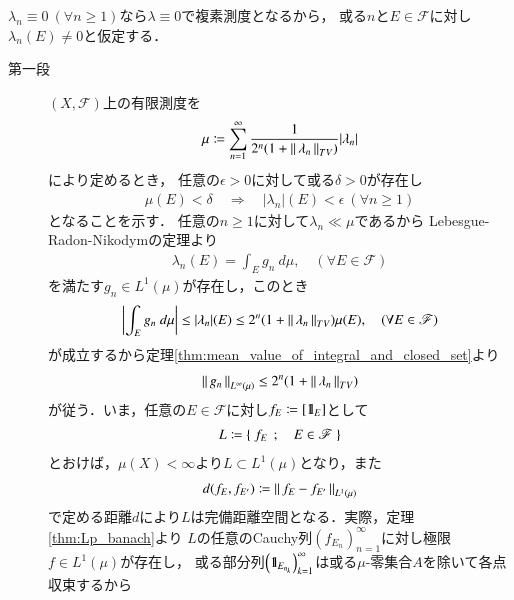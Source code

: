 	\begin{prf}$\lambda_n \equiv 0\ (\forall n \geq 1)$なら$\lambda \equiv 0$で複素測度となるから，
		或る$n$と$E \in \mathscr{F}$に対し$\lambda_n(E) \neq 0$と仮定する．
		\begin{description}
			\item[第一段] $(X,\mathscr{F})$上の有限測度を
				\begin{align}
					\mu \coloneqq \sum_{n=1}^\infty \frac{1}{2^n(1 + \left\|\, \lambda_n\, \right\|_{TV})} |\lambda_n|
				\end{align}
				により定めるとき，%
				任意の$\epsilon > 0$に対して或る$\delta > 0$が存在し
				\begin{align}
					\mu(E) < \delta \quad \Rightarrow \quad |\lambda_n|(E) < \epsilon\ (\forall n \geq 1)
					\label{eq:thm_Vitali_Hahn_Saks_2}
				\end{align}
				となることを示す．
				任意の$n \geq 1$に対して$\lambda_n \ll \mu$であるから
				Lebesgue-Radon-Nikodymの定理より
				\begin{align}
					\lambda_n(E) = \int_E g_n\ d\mu,
					\quad (\forall E \in \mathscr{F})
				\end{align}
				を満たす$g_n \in L^1(\mu)$が存在し，このとき
				\begin{align}
					\left| \int_E g_n\ d\mu \right|
					\leq |\lambda_n|(E)
					\leq 2^n(1+\left\|\, \lambda_n\, \right\|_{TV})\mu(E),
					\quad (\forall E \in \mathscr{F})
				\end{align}
				が成立するから定理\ref{thm:mean_value_of_integral_and_closed_set}より
				\begin{align}
					\left\|\, g_n\, \right\|_{L^\infty(\mu)} \leq 2^n(1+\left\|\, \lambda_n\, \right\|_{TV})
				\end{align}
				が従う．いま，任意の$E \in \mathscr{F}$に対し$f_E \coloneqq [\mbox{1}\hspace{-0.25em}\mbox{l}_E]$として
				\begin{align}
					L \coloneqq \left\{\ f_E\ \, ; \quad E \in \mathscr{F}\ \right\}
				\end{align}
				とおけば，$\mu(X) < \infty$より$L \subset L^1(\mu)$となり，また
				\begin{align}
					d(f_E,f_{E'}) \coloneqq \left\|\, f_E - f_{E'}\, \right\|_{L^1(\mu)}
				\end{align}
				で定める距離$d$により$L$は完備距離空間となる．実際，定理\ref{thm:Lp_banach}より
				$L$の任意のCauchy列$\left(f_{E_n}\right)_{n=1}^\infty$に対し極限$f \in L^1(\mu)$が存在し，
				或る部分列$\left(\mbox{1}\hspace{-0.25em}\mbox{l}_{E_{n_k}}\right)_{k=1}^\infty$は或る$\mu$-零集合$A$を除いて各点収束するから
				\begin{align}

\end{align}
\end{description}
\end{prf}
